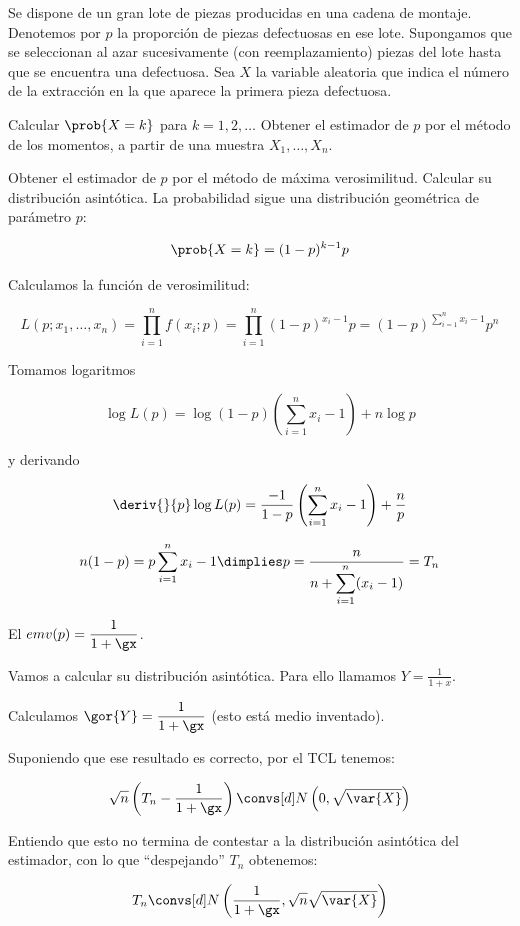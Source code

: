 \begin{problem}[3] Se dispone de un gran lote de piezas producidas en una cadena de montaje. Denotemos por $p$ la proporción de piezas defectuosas en ese lote. Supongamos que se seleccionan al azar sucesivamente (con reemplazamiento) piezas del lote hasta que se encuentra una defectuosa. Sea $X$ la variable aleatoria que indica el número de la extracción en la que aparece la primera pieza defectuosa.

\ppart Calcular $\prob{X=k}$ para $k=1,2,\dotsc$ Obtener el estimador de $p$ por el método de los momentos, a partir de una muestra $X_1,\dotsc , X_n$.

\ppart Obtener el estimador de $p$ por el método de máxima verosimilitud. Calcular su distribución asintótica.
\solution
\spart
La probabilidad sigue una distribución geométrica de parámetro $p$:

\[ \prob{X=k} = (1-p)^{k-1}p \]

\spart Calculamos la función de verosimilitud:

\[ L(p;x_1,\dotsc,x_n) = \prod_{i=1}^n f(x_i;p) = \prod_{i=1}^n (1-p)^{x_i - 1}p = (1-p)^{\sum_{i=1}^n x_i - 1} p^n \]

Tomamos logaritmos

\[ \log L(p) = \log(1-p) \left(\sum_{i=1}^n x_i - 1\right) + n\log p \]

y derivando

\[ \deriv{}{p} \log L(p) = \frac{-1}{1-p} \left(\sum_{i=1}^n x_i - 1\right)  + \frac{n}{p} \] 

\[n(1-p) = p \sum_{i=1}^n x_i - 1 \dimplies p = \frac{n}{n + \displaystyle \sum_{i=1}^n (x_i-1)} = T_n\]

El $emv(p) = \displaystyle\frac{1}{1 + \gx}$.

Vamos a calcular su distribución asintótica. Para ello llamamos $Y = \displaystyle \frac{1}{1+x}$.

Calculamos $\gor{Y} = \displaystyle\frac{1}{1+\gx}$ (esto está medio inventado).

Suponiendo que ese resultado es correcto, por el TCL tenemos:

\[\sqrt{n} \left(T_n - \frac{1}{1+\gx}\right) \convs[d] N\left(0,\sqrt{\var{X}}\right)\]

Entiendo que esto no termina de contestar a la distribución asintótica del estimador, con lo que ``despejando'' $T_n$ obtenemos:

\[T_n \convs[d] N\left(\frac{1}{1+\gx} , \sqrt{n}\sqrt{ \var{X}}\right)\]

\end{problem}

